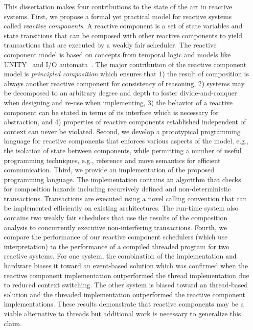 \documentclass[letterpaper]{book}
\begin{document}
This dissertation makes four contributions to the state of the art in reactive systems.
First, we propose a formal yet practical model for reactive systems called \emph{reactive components}.
A reactive component is a set of state variables and state transitions that can be composed with other reactive components to yield transactions that are executed by a weakly fair scheduler.
The reactive component model is based on concepts from temporal logic and models like UNITY~\cite{chandy1989parallel} and I/O automata~\cite{nancy1996distributed}.
The major contribution of the reactive component model is \emph{principled composition} which ensures that 1) the result of composition is always another reactive component for consistency of reasoning, 2) systems may be decomposed to an arbitrary degree and depth to foster divide-and-conquer when designing and re-use when implementing, 3) the behavior of a reactive component can be stated in terms of its interface which is necessary for abstraction, and 4) properties of reactive components established independent of context can never be violated.
Second, we develop a prototypical programming language for reactive components that enforces various aspects of the model, e.g., the isolation of state between components, while permitting a number of useful programming techniques, e.g., reference and move semantics for efficient communication.
Third, we provide an implementation of the proposed programming language.
The implementation contains an algorithm that checks for composition hazards including recursively defined and non-deterministic transactions.
Transactions are executed using a novel calling convention that can be implemented efficiently on existing architectures.
The run-time system also contains two weakly fair schedulers that use the results of the composition analysis to concurrently executive non-interfering transactions.
Fourth, we compare the performance of our reactive component schedulers (which use interpretation) to the performance of a compiled threaded program for two reactive systems.
For one system, the combination of the implementation and hardware biases it toward an event-based solution which was confirmed when the reactive component implementation outperformed the thread implementation due to reduced context switching.
The other system is biased toward an thread-based solution and the threaded implementation outperformed the reactive component implementations.
These results demonstrate that reactive components may be a viable alternative to threads but additional work is necessary to generalize this claim.
\end{document}
